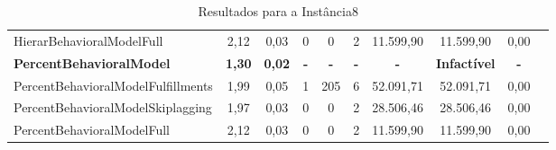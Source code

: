 \begin{table}[H]
{\begin{tabular}{lccccccccc}
            HierarBehavioralModelFull & 2,12 & 0,03 & 0 & 0 & 2 & 11.599,90 & 11.599,90 & 0,00 \\
            \textbf{PercentBehavioralModel} & \textbf{1,30} & \textbf{0,02} & \textbf{-} & \textbf{-} & \textbf{-} & \textbf{- }& \textbf{Infactível} & \textbf{- }\\
            PercentBehavioralModelFulfillments & 1,99 & 0,05 & 1 & 205 & 6 & 52.091,71 & 52.091,71 & 0,00 \\
            PercentBehavioralModelSkiplagging & 1,97 & 0,03 & 0 & 0 & 2 & 28.506,46 & 28.506,46 & 0,00 \\
            PercentBehavioralModelFull & 2,12 & 0,03 & 0 & 0 & 2 & 11.599,90 & 11.599,90 & 0,00 \\ \hline
        \end{tabular}%
    }
    \caption{Resultados para a Instância8}
    \label{tab:resultado_instancia8}
\end{table}


